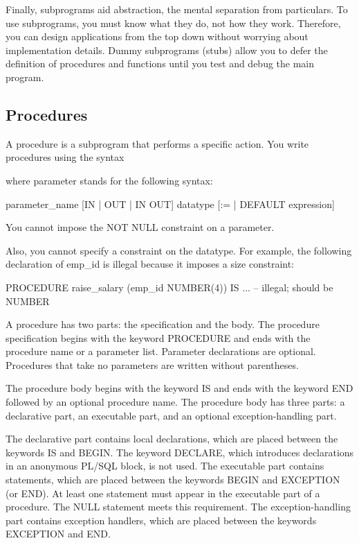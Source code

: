 Finally, subprograms aid abstraction, the mental separation from particulars. To use subprograms, you must know what they do, not how they work. Therefore, you can design applications from the top down without worrying about implementation details. Dummy subprograms (stubs) allow you to defer the definition of procedures and functions until you test and debug the main program.

\subsection{Procedures}
A procedure is a subprogram that performs a specific action. You write procedures using the syntax

where parameter stands for the following syntax:

parameter\_name [IN | OUT | IN OUT] datatype [{:= | DEFAULT} expression]

You cannot impose the NOT NULL constraint on a parameter.

Also, you cannot specify a constraint on the datatype. For example, the following declaration of emp\_id is illegal because it imposes a size constraint:

PROCEDURE raise\_salary (emp\_id NUMBER(4)) IS ...  -- illegal; should be NUMBER

A procedure has two parts: the specification and the body. The procedure specification begins with the keyword PROCEDURE and ends with the procedure name or a parameter list. Parameter declarations are optional. Procedures that take no parameters are written without parentheses.

The procedure body begins with the keyword IS and ends with the keyword END followed by an optional procedure name. The procedure body has three parts: a declarative part, an executable part, and an optional exception-handling part.

The declarative part contains local declarations, which are placed between the keywords IS and BEGIN. The keyword DECLARE, which introduces declarations in an anonymous PL/SQL block, is not used. The executable part contains statements, which are placed between the keywords BEGIN and EXCEPTION (or END). At least one statement must appear in the executable part of a procedure. The NULL statement meets this requirement. The exception-handling part contains exception handlers, which are placed between the keywords EXCEPTION and END.

